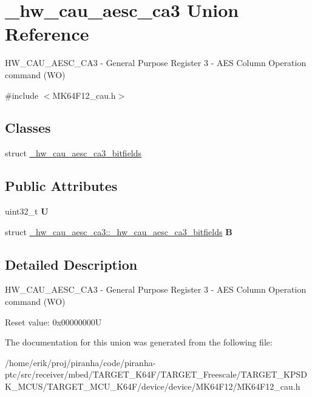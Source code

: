 \hypertarget{union__hw__cau__aesc__ca3}{}\section{\+\_\+hw\+\_\+cau\+\_\+aesc\+\_\+ca3 Union Reference}
\label{union__hw__cau__aesc__ca3}


H\+W\+\_\+\+C\+A\+U\+\_\+\+A\+E\+S\+C\+\_\+\+C\+A3 -\/ General Purpose Register 3 -\/ A\+ES Column Operation command (WO)  




{\ttfamily \#include $<$M\+K64\+F12\+\_\+cau.\+h$>$}

\subsection*{Classes}
\begin{DoxyCompactItemize}
\item 
struct \hyperlink{struct__hw__cau__aesc__ca3_1_1__hw__cau__aesc__ca3__bitfields}{\+\_\+hw\+\_\+cau\+\_\+aesc\+\_\+ca3\+\_\+bitfields}
\end{DoxyCompactItemize}
\subsection*{Public Attributes}
\begin{DoxyCompactItemize}
\item 
uint32\+\_\+t {\bfseries U}\hypertarget{union__hw__cau__aesc__ca3_ae4e3e8dfd181e5f970bc6efea5183468}{}\label{union__hw__cau__aesc__ca3_ae4e3e8dfd181e5f970bc6efea5183468}

\item 
struct \hyperlink{struct__hw__cau__aesc__ca3_1_1__hw__cau__aesc__ca3__bitfields}{\+\_\+hw\+\_\+cau\+\_\+aesc\+\_\+ca3\+::\+\_\+hw\+\_\+cau\+\_\+aesc\+\_\+ca3\+\_\+bitfields} {\bfseries B}\hypertarget{union__hw__cau__aesc__ca3_ac3f51c00177951e2df9a9205ebbe2c16}{}\label{union__hw__cau__aesc__ca3_ac3f51c00177951e2df9a9205ebbe2c16}

\end{DoxyCompactItemize}


\subsection{Detailed Description}
H\+W\+\_\+\+C\+A\+U\+\_\+\+A\+E\+S\+C\+\_\+\+C\+A3 -\/ General Purpose Register 3 -\/ A\+ES Column Operation command (WO) 

Reset value\+: 0x00000000U 

The documentation for this union was generated from the following file\+:\begin{DoxyCompactItemize}
\item 
/home/erik/proj/piranha/code/piranha-\/ptc/src/receiver/mbed/\+T\+A\+R\+G\+E\+T\+\_\+\+K64\+F/\+T\+A\+R\+G\+E\+T\+\_\+\+Freescale/\+T\+A\+R\+G\+E\+T\+\_\+\+K\+P\+S\+D\+K\+\_\+\+M\+C\+U\+S/\+T\+A\+R\+G\+E\+T\+\_\+\+M\+C\+U\+\_\+\+K64\+F/device/device/\+M\+K64\+F12/M\+K64\+F12\+\_\+cau.\+h\end{DoxyCompactItemize}
